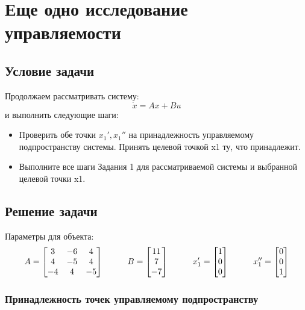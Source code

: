 \chapter{Еще одно исследование управляемости}
\label{ch:chap2}
\section{Условие задачи}

Продолжаем рассматривать систему:
$$
  \dot{x} = Ax + Bu
$$ и выполнить следующие шаги:

\begin{itemize}
    \item Проверить обе точки $x_1', x_1''$ на принадлежность управляемому подпространству
    системы. Принять целевой точкой x1 ту, что принадлежит.
    \item Выполните все шаги Задания 1 для рассматриваемой системы и выбранной целевой точки x1.
\end{itemize}

\section{Решение задачи}

Параметры для объекта:
$$
  A = \begin{bmatrix}
    3   &	-6	&  4 \\
    4   &   -5  &  4 \\
    -4  &    4  &  -5
  \end{bmatrix} \hspace*{1cm}
  B = \begin{bmatrix}
    11 \\ 7 \\ -7 
  \end{bmatrix} \hspace*{1cm}
  x_1' = \begin{bmatrix}
    1 \\ 0 \\ 0 
  \end{bmatrix} \hspace*{1cm}
  x_1'' = \begin{bmatrix}
  0 \\ 0 \\ 1
  \end{bmatrix} 
$$

\subsection{Принадлежность точек управляемому подпространству}


